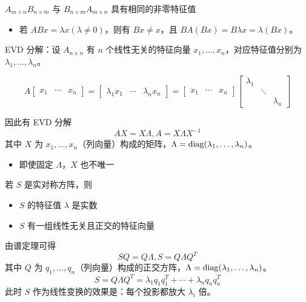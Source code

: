 \begin{remark}
    $A_{m\times n}B_{n\times m}$ 与 $B_{n\times m}A_{m\times n}$ 具有相同的非零特征值
    \begin{itemize}
        \item 若 $ABx = \lambda x(\lambda \neq 0)$，则有 $Bx \neq x$，且 $BA(Bx) = B\lambda x = \lambda (Bx)$。
    \end{itemize}
\end{remark}

\begin{remark}
    EVD 分解：设 $A_{n\times n}$ 有 $n$ 个线性无关的特征向量 $x_1, \dots, x_n$，对应特征值分别为 $\lambda_1, \dots, \lambda_n$。
    
    \[A\begin{bmatrix}
        x_1 & \cdots & x_n 
    \end{bmatrix} = \begin{bmatrix}
        \lambda_1 x_1 & \cdots & \lambda_n x_n 
    \end{bmatrix} = \begin{bmatrix}
        x_1 & \cdots & x_n 
    \end{bmatrix} \begin{bmatrix}
        \lambda_1 & & \\
        & \ddots & \\
        & & \lambda_n
    \end{bmatrix}\]
    
    因此有 EVD 分解 \[AX = X\Lambda, A = X\Lambda X^{-1}\]
    其中 $X$ 为 $x_1, \dots, x_n$（列向量）构成的矩阵，$\Lambda = \operatorname{diag}(\lambda_1, \dots, \lambda_n)$。
    \begin{itemize}
        \item 即使固定 $\Lambda$，$X$ 也不唯一
    \end{itemize} 
\end{remark}

\begin{remark}
    若 $S$ 是实对称方阵，则 
    \begin{itemize}
        \item $S$ 的特征值 $\lambda$ 是实数
        \item $S$ 有一组线性无关且正交的特征向量
    \end{itemize}

    由谱定理可得 \[SQ = Q\Lambda, S = Q\Lambda Q^T\]
    其中 $Q$ 为 $q_1, \dots, q_n$（列向量）构成的正交方阵，$\Lambda = \operatorname{diag}(\lambda_1, \dots, \lambda_n)$。
    \[S = Q\Lambda Q^T = \lambda_1q_1q_1^T + \cdots + \lambda_nq_nq_n^T\]
    此时 $S$ 作为线性变换的效果是：每个投影都放大 $\lambda_i$ 倍。
\end{remark}

